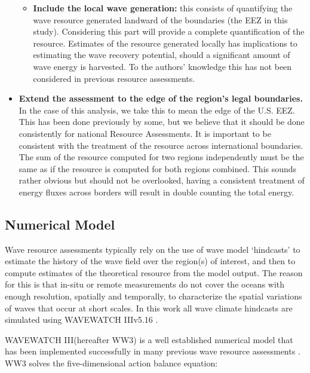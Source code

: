 \begin{itemize}
\begin{itemize}
    \item {\bf Include the local wave generation:} this consists of quantifying the wave resource generated landward of the boundaries (the EEZ in this study). Considering this part will provide a complete quantification of the resource. Estimates of the resource generated locally has implications to estimating the wave recovery potential, should a significant amount of wave energy is harvested. To the authors' knowledge this has not been considered in previous resource assessments.
\end{itemize}
\item {\bf Extend the assessment to the edge of the region's legal boundaries.} In the case of this analysis, we take this to mean the edge of the U.S. EEZ. This has been done previously by some, but we believe that it should be done consistently for national Resource Assessments. It is important to be consistent with the treatment of the resource across international boundaries. The sum of the resource computed for two regions independently must be the same as if the resource is computed for both regions combined. This sounds rather obvious but should not be overlooked, having a consistent treatment of energy fluxes across borders will result in double counting the total energy.
\end{itemize}


\subsection{Numerical Model} \label{sec:method:model}

Wave resource assessments typically rely on the use of wave model `hindcasts' to estimate the history of the wave field over the region(s) of interest, and then to compute estimates of the theoretical resource from the model output. The reason for this is that in-situ or remote measurements do not cover the oceans with enough resolution, spatially and temporally, to characterize the spatial variations of waves that occur at short scales. 
In this work all wave climate hindcasts are simulated using WAVEWATCH III\textregistered v5.16 \citep{tolmanDistributedmemoryConceptsWave2002,tolmanwavewatch}.

WAVEWATCH III\textregistered (hereafter WW3) is a  well established numerical model that has been implemented successfully in many previous wave resource assessments \citep[e.g.,][]{garcia-medinaWaveResourceAssessment2014,hemerRevisedAssessmentAustralia2017,yangWaveModelTest2017}.
WW3 solves the five-dimensional action balance equation:

